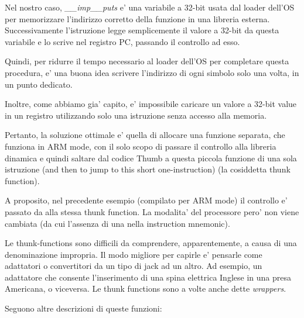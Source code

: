 Nel nostro caso, \emph{\_\_imp\_\_puts} e' una variabile a 32-bit usata dal loader dell'\ac{OS} per memorizzare l'indirizzo corretto
della funzione in una libreria esterna. 
Successivamente l'istruzione  legge semplicemente il valore a 32-bit da questa variabile e lo scrive nel registro \ac{PC},
passando il controllo ad esso.

Quindi, per ridurre il tempo necessario al loader dell'\ac{OS} per completare questa procedura, e' una buona idea scrivere l'indirizzo
di ogni simbolo solo una volta, in un punto dedicato.

Inoltre, come abbiamo gia' capito, e' impossibile caricare un valore a 32-bit value in un registro utilizzando solo una istruzione senza
accesso alla memoria.

Pertanto, la soluzione ottimale e' quella di allocare una funzione separata, che funziona in ARM mode, con il solo scopo di passare
il controllo alla libreria dinamica e quindi saltare dal codice Thumb a questa piccola funzione di una sola istruzione (and then to jump to this short one-instruction)
(la cosiddetta \gls{thunk function}).

A proposito, nel precedente esempio (compilato per ARM mode) il controllo e' passato da  alla stessa \gls{thunk function}.
La modalita' del processore pero' non viene cambiata (da cui l'assenza di una  nella instruction mnemonic).


Le thunk-functions sono difficili da comprendere, apparentemente, a causa di una denominazione impropria.
Il modo migliore per capirle e' pensarle come adattatori o convertitori da un tipo di jack ad un altro.
Ad esempio, un adattatore che consente l'inserimento di una spina elettrica Inglese in una presa Americana, o viceversa.
Le thunk functions sono a volte anche dette \emph{wrappers}.

Seguono altre descrizioni di queste funzioni:

